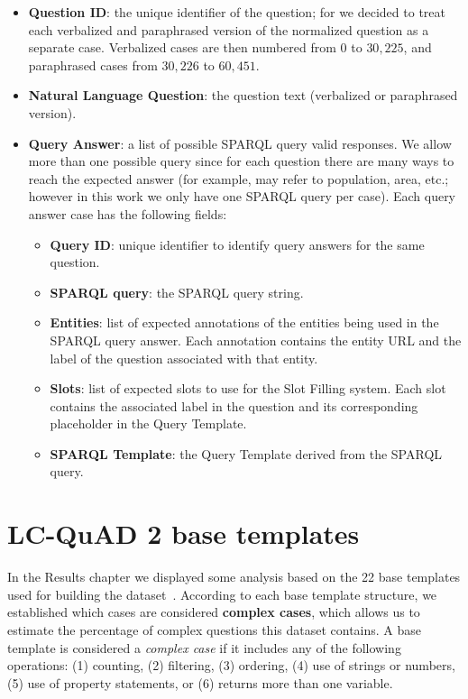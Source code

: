 \begin{itemize}
    \item \textbf{Question ID}: the unique identifier of the question; for \LCQuADtwo{} we decided to 
    treat each verbalized and paraphrased version of the normalized question as a separate case. 
    Verbalized cases are then numbered from $0$ to $30,225$, and paraphrased cases from $30,226$ to $60,451$.
    \item \textbf{Natural Language Question}: the question text (verbalized or paraphrased version).
    \item \textbf{Query Answer}: a list of possible SPARQL query valid responses. We allow more than 
    one possible query since for each question there are many ways to reach the expected answer (for 
    example,  may refer to population, area, etc.; however in 
    this work we only have one SPARQL query per case). Each query answer case has the following fields:
    \begin{itemize}
        \item \textbf{Query ID}: unique identifier to identify query answers for the same question.
        \item \textbf{SPARQL query}: the SPARQL query string.
        \item \textbf{Entities}: list of expected annotations of the entities being used in the 
        SPARQL query answer. Each annotation contains the entity URL and the label of the question 
        associated with that entity.
        \item \textbf{Slots}: list of expected slots to use for the Slot Filling system. Each slot 
        contains the associated label in the question and its corresponding placeholder in the Query 
        Template.
        \item \textbf{SPARQL Template}: the Query Template derived from the SPARQL query.
    \end{itemize}
\end{itemize}

\section{LC-QuAD 2 base templates}
\label{appendix:qaDataset/baseTemplates}
In the Results chapter we displayed some analysis based on the 22 base templates used for building 
the \LCQuADtwo{} dataset~\cite{dataset:lcquad2-DubeyBA019}. According to each base template structure, 
we established which cases are considered \textbf{complex cases}, which allows us to estimate the 
percentage of complex questions this dataset contains. A base template is considered a \textit{complex 
case} if it includes any of the following operations: (1) counting, (2) filtering, (3) ordering, 
(4) use of strings or numbers,(5) use of property statements, or (6) returns more than one variable. 

